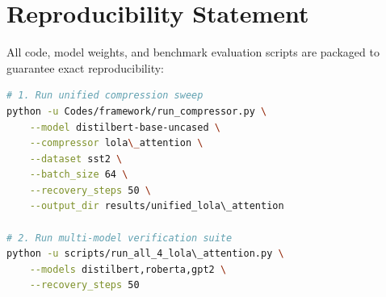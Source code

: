 \section{Reproducibility Statement}
All code, model weights, and benchmark evaluation scripts are packaged to guarantee exact reproducibility:
\begin{lstlisting}[language=bash]
# 1. Run unified compression sweep
python -u Codes/framework/run_compressor.py \
    --model distilbert-base-uncased \
    --compressor lola\_attention \
    --dataset sst2 \
    --batch_size 64 \
    --recovery_steps 50 \
    --output_dir results/unified_lola\_attention

# 2. Run multi-model verification suite
python -u scripts/run_all_4_lola\_attention.py \
    --models distilbert,roberta,gpt2 \
    --recovery_steps 50
\end{lstlisting}

